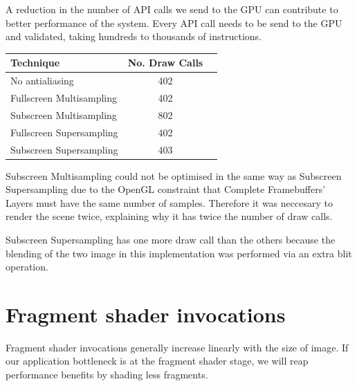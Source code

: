 \documentclass[12pt,a4paper,twoside,openright]{report}
\begin{document}
A reduction in the number of API calls we send to the GPU can contribute to better performance of the system. Every API call needs to be send to the GPU and validated, taking hundreds to thousands of instructions.

\begin{center}
\begin{tabular}{l|c|r}
Technique   & No. Draw Calls \\ 
\hline
No antialiasing      & 402 \\
Fullscreen Multisampling     & 402 \\
Subscreen Multisampling    &  802  \\
Fullscreen Supersampling      &  402   \\
Subscreen Supersampling    &  403  \\
\end{tabular}
\end{center}

Subscreen Multisampling could not be optimised in the same way as Subscreen Supersampling due to the OpenGL constraint that Complete Framebuffers' Layers must have the same number of samples. Therefore it was neccesary to render the scene twice, explaining why it has twice the number of draw calls.

Subscreen Supersampling has one more draw call than the others because the blending of the two image in this implementation was performed via an extra blit operation.

\section{Fragment shader invocations}

Fragment shader invocations generally increase linearly with the size of image. If our application bottleneck is at the fragment shader stage, we will reap performance benefits by shading less fragments.
\end{document}
